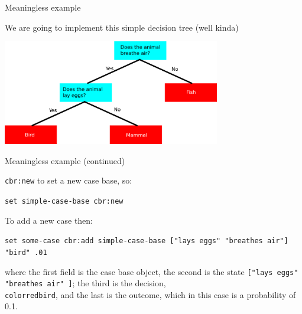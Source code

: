 \documentclass[usenames,dvipsnames,10pt]{beamer} %
\begin{document}
\begin{frame}{Meaningless example}

    We are going to implement this simple decision tree (well kinda)

    \vspace{0.5cm}

    \includegraphics[width=9.5cm]{img/simple-decision-tree.png}

\end{frame}
\begin{frame}{Meaningless example (continued)}

    {\color{blue}\texttt{cbr:new}} to set a new case base, so:

    \vspace{0.5cm}

    \small
    \texttt{set simple-case-base {\color{blue}cbr:new}}

    \vspace{0.5cm}

    \normalsize
    To add a new case then:

    \vspace{0.5cm}

    \small
    \texttt{set some-case {\color{blue}cbr:add}  simple-case-base [{\color{red}"lays eggs" "breathes air"}] {\color{red}"bird"} .01}

    \vspace{0.5cm}

    \normalsize
    where the first field is the case base object, the second is the state \texttt{[{\color{red}"lays eggs" "breathes air"} ]}; the third is the decision, \texttt{{\\color{red}}bird}, and the last is the outcome, which in this case is a probability of 0.1.

\end{frame}
\end{document}

